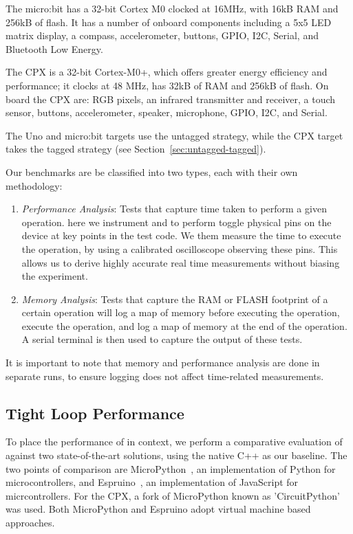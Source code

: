 The micro:bit has a 32-bit Cortex M0 clocked at 16MHz, with 16kB RAM and 256kB of flash. It has a number of onboard components 
including a 5x5 LED matrix display, a compass, accelerometer, buttons, GPIO, I2C, Serial, and Bluetooth Low Energy.

The CPX is a 32-bit Cortex-M0+, which offers greater energy efficiency and performance; it clocks at 48 MHz, has 32kB of RAM and 
256kB of flash. On board the CPX are: RGB pixels, an infrared transmitter and receiver, a touch sensor, buttons, accelerometer, speaker, 
microphone, GPIO, I2C, and Serial.

The Uno and micro:bit \MC targets use the untagged strategy, while the CPX target takes the tagged strategy (see Section~\ref{sec:untagged-tagged}).

Our benchmarks are be classified into two types, each with their own methodology:

\begin{enumerate}
    \item \textit{Performance Analysis}: Tests that capture time taken to perform a given operation. here we instrument
    \MC and \CO to perform toggle physical pins on the device at key points in the test code. We them measure the time to
   execute the operation, by using a calibrated oscilloscope observing these pins. This allows us to derive highly accurate real time 
   measurements without biasing the experiment.

    \item \textit{Memory Analysis}: Tests that capture the RAM or FLASH footprint of a certain operation will log a map of memory 
    before executing the operation, execute the operation, and log a map of memory at the end of the operation. 
    A serial terminal is then used to capture the output of these tests.
\end{enumerate}

It is important to note that memory and performance analysis are done in separate runs, 
to ensure logging does not affect time-related measurements.

\subsection{Tight Loop Performance}

To place the performance of \MC in context, we perform a comparative evaluation of \MC against two state-of-the-art 
solutions, using the native C++ as our baseline. The two points of comparison are MicroPython~\cite{MicroPython}, an implementation 
of Python for microcontrollers, and Espruino~\cite{espruinoBook}, an implementation of JavaScript for micrcontrollers. 
For the CPX, a fork of MicroPython known as 'CircuitPython' was used. Both MicroPython and Espruino adopt virtual machine based
approaches.

